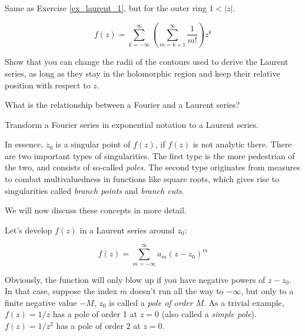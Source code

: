 \begin{exer}
  Same as Exercise \ref{ex_laurent_1}, but for the outer ring  $1 < | z |$.

\begin{sol}
$$f(z)=  \sum_{k=-\infty}^{\infty} \left(\sum_{m=k+1}^\infty \frac{1}{m!} \right) z^k $$
\end{sol}
  
\end{exer}

\begin{exer}
  Show that you can change the radii of the contours used to derive the Laurent series, as long as they stay in the holomorphic region and keep their relative position with respect to $z$.

\end{exer}

\begin{exer}
What is the relationship between a Fourier and a Laurent series?
  \begin{hnt}
  Transform a Fourier series in exponential notation to a Laurent series.
  \end{hnt}
\end{exer}


\pagebreak



In essence, $z_0$ is a singular point of $f(z)$, if $f(z)$ is not analytic there. There are two important types of singularities. The first type is the more pedestrian of the two, and consists of so-called \emph{poles}. The second type originates from measures to combat multivaluedness in functions like square roots, which gives rise to singularities called \emph{branch points} and \emph{branch cuts}. 

We will now discuss these concepts in more detail.


Let's develop $f(z)$ in a Laurent series around $z_0$:

\begin{equation}
f(z)= \sum_{m=-\infty}^{\infty} a_m (z-z_0)^m
\end{equation} 

Obviously, the function will only blow up if you have negative powers of $z-z_0$. In that case, suppose the index $m$ doesn't run all the way to $-\infty$, but only to a finite negative value $-M$, $z_0$ is called a \emph{pole of order $M$}. As a trivial example, $f(z)=1/z$ has a pole of order 1 at $z=0$ (also called a \emph{simple pole}). $f(z)=1/z^2$ has a pole of order 2 at $z=0$.

